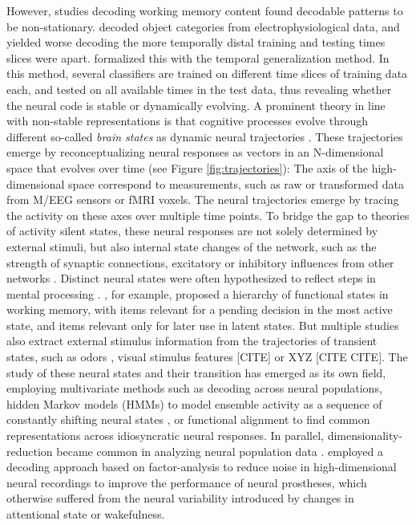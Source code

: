 However, studies decoding working memory content found decodable patterns to be non-stationary.
\citet{meyers2008dynamic} decoded object categories from electrophysiological data, and yielded worse decoding the more temporally distal training and testing times slices were apart.
\citet{king2014characterizing} formalized this with the temporal generalization method.
In this method, several classifiers are trained on different time slices of training data each, and tested on all available times in the test data, thus revealing whether the neural code is stable or dynamically evolving.
A prominent theory in line with non-stable representations is that cognitive processes evolve through different so-called \textit{brain states} as dynamic neural trajectories \citep{buonomano2009state}.
These trajectories emerge by reconceptualizing neural responses as vectors in an N-dimensional space that evolves over time (see Figure \ref{fig:trajectories}):
The axis of the high-dimensional space correspond to measurements, such as raw or transformed data from M/EEG sensors or \gls{fMRI} voxels.
The neural trajectories emerge by tracing the activity on these axes over multiple time points.
To bridge the gap to theories of activity silent states, these neural responses are not solely determined by external stimuli, but also internal state changes of the network, such as the strength of synaptic connections, excitatory or inhibitory influences from other networks \citep{buonomano2009state}.
Distinct neural states were often hypothesized to reflect steps in mental processing \citep[e.g.,][]{seidemann1996simultaneously}.
\citet{muhle2021hierarchy}, for example, proposed a hierarchy of functional states in working memory, with items relevant for a pending decision in the most active state, and items relevant only for later use in latent states.
But multiple studies also extract external stimulus information from the trajectories of transient states, such as odors \citep{mazor2005transient}, visual stimulus features [CITE] or XYZ [CITE CITE].
The study of these neural states and their transition has emerged as its own field, employing multivariate methods such as decoding across neural populations, hidden Markov models (HMMs) to model ensemble activity as a sequence of constantly shifting neural states \citep{rainer2000neural}, or functional alignment \citep{haxby2011common} to find common representations across idiosyncratic neural responses.
In parallel, dimensionality-reduction became common in analyzing neural population data \citep{cunningham2014dimensionality}.
\citet{santhanam2009factor} employed a decoding approach based on factor-analysis to reduce noise in high-dimensional neural recordings to improve the performance of neural prostheses, which otherwise suffered from the neural variability introduced by changes in attentional state or wakefulness.

